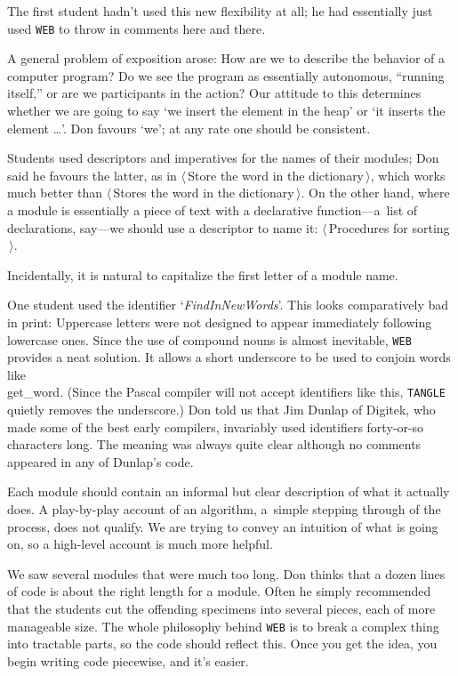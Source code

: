 The first student hadn't used this new flexibility at all; he had
essentially just used {\tt WEB} to throw in comments here and there.

A general problem of exposition arose: How are we to describe the
behavior of a computer program? Do we see the program as essentially
autonomous, ``running itself,'' or are we participants in the action?
Our attitude to this determines whether we are going to say `we insert
the element in the heap' or `it inserts the element \dots'. Don favours
`we'; at any rate one should be consistent.

Students used descriptors and imperatives for the names of their modules;
Don said he favours the latter, as in 
$\langle\,$Store the word in the dictionary$\,\rangle$,
which works much better than $\langle\,$Stores the word in the
dictionary$\,\rangle$.
On the other hand,
where a module is essentially a piece of text with a declarative 
function---a~list of declarations, say---we should use a descriptor to name it:
$\langle\,$Procedures for sorting$\,\rangle$.

Incidentally, it is natural to capitalize the first letter of a module name.

One student used the identifier `{\it FindInNewWords\/}'. This looks 
comparatively bad in
print: Uppercase letters were not designed to appear immediately
following lowercase ones. Since the use of compound nouns is almost
inevitable, {\tt WEB} provides a neat solution. It allows a short underscore
to be used to conjoin words like \\{get\_word}. (Since the Pascal compiler
will not accept identifiers like this, {\tt TANGLE} quietly removes the
underscore.) Don told us that Jim Dunlap of
Digitek, who made some of the best
early compilers, invariably used identifiers forty-or-so characters
long. The meaning was always quite clear although no comments
appeared in any of Dunlap's code.

Each module should contain an informal but clear description of what
it actually does. A play-by-play account of an algorithm, a~simple
stepping through of the process, does not qualify. We are trying to
convey an intuition of what is going on, so a high-level account is
much more helpful.

We saw several modules that were much too long. Don thinks that a
dozen lines of code is about the right length for a module. Often he
simply recommended that the students cut the offending specimens into
several pieces, each of more manageable size. The whole philosophy
behind {\tt WEB} is to break a complex thing into tractable parts, so the
code should reflect this. Once you get the idea, you begin writing
code piecewise, and it's easier.

